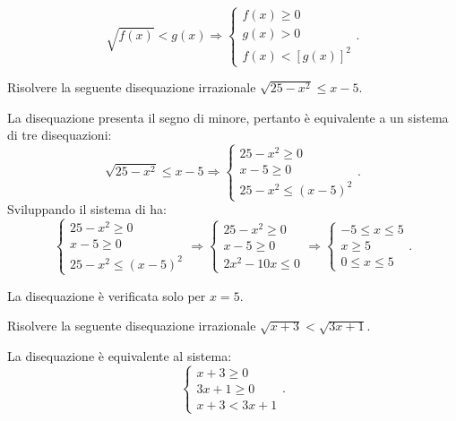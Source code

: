 \begin{equation*}
\sqrt{f(x)}<g(x) \Rightarrow \left\{\begin{array}{l}f(x)\ge 0\\g(x)>0\\f(x)<\left[g(x)\right]^2\end{array}\right..
\end{equation*}

\begin{exrig}
\begin{esempio}
Risolvere la seguente disequazione irrazionale $\sqrt{25-x^2}\le x-5$.

La disequazione presenta il segno di minore, pertanto è equivalente a un sistema di tre disequazioni: 
\[\sqrt{25-x^2}\le x-5 \Rightarrow \left\{\begin{array}{l}25-x^2\ge 0\\x-5\ge 0 \\25-x^2\le (x-5)^2\end{array}\right..\]
Sviluppando il sistema di ha: 
\[\left\{\begin{array}{l}25-x^2\ge 0\\x-5\ge 0\\25-x^2\le (x-5)^2\end{array}\right. \Rightarrow \left\{\begin{array}{l}25-x^2\ge 0\\x-5\ge 0 \\2x^2-10x\le 0\end{array}\right. \Rightarrow \left\{\begin{array}{l}-5\le x\le 5\\x\ge 5\\0\le x\le 5\end{array}\right..\]

\begin{center}
 
\end{center}
La disequazione è verificata solo per $x=5$.
\end{esempio}

\begin{esempio}
Risolvere la seguente disequazione irrazionale $\sqrt{x+3}<\sqrt{3x+1}$.

La disequazione è equivalente al sistema: 
\[\left\{\begin{array}{l}x+3\ge 0\\3x+1\ge 0\\x+3<3x+1\end{array}\right..\]


\end{esempio}
\end{exrig}

